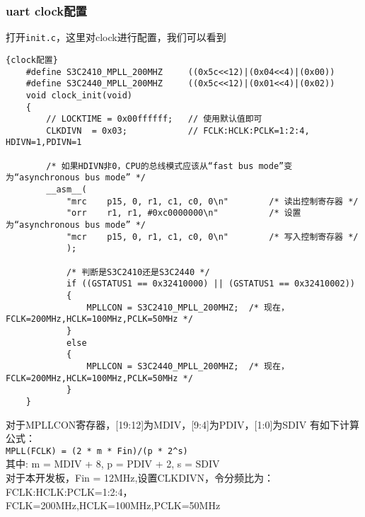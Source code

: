 \subsubsection{uart clock配置}
打开\lstinline{init.c}，这里对clock进行配置，我们可以看到
\lstset{language=C}
\begin{lstlisting}{clock配置}
    #define S3C2410_MPLL_200MHZ     ((0x5c<<12)|(0x04<<4)|(0x00))
    #define S3C2440_MPLL_200MHZ     ((0x5c<<12)|(0x01<<4)|(0x02))
    void clock_init(void)
    {
        // LOCKTIME = 0x00ffffff;   // 使用默认值即可
        CLKDIVN  = 0x03;            // FCLK:HCLK:PCLK=1:2:4, HDIVN=1,PDIVN=1

        /* 如果HDIVN非0，CPU的总线模式应该从“fast bus mode”变为“asynchronous bus mode” */
        __asm__(
            "mrc    p15, 0, r1, c1, c0, 0\n"        /* 读出控制寄存器 */ 
            "orr    r1, r1, #0xc0000000\n"          /* 设置为“asynchronous bus mode” */
            "mcr    p15, 0, r1, c1, c0, 0\n"        /* 写入控制寄存器 */
            );

            /* 判断是S3C2410还是S3C2440 */
            if ((GSTATUS1 == 0x32410000) || (GSTATUS1 == 0x32410002))
            {
                MPLLCON = S3C2410_MPLL_200MHZ;  /* 现在，FCLK=200MHz,HCLK=100MHz,PCLK=50MHz */
            }
            else
            {
                MPLLCON = S3C2440_MPLL_200MHZ;  /* 现在，FCLK=200MHz,HCLK=100MHz,PCLK=50MHz */
            }       
    }
\end{lstlisting}
对于MPLLCON寄存器，[19:12]为MDIV，[9:4]为PDIV，[1:0]为SDIV
有如下计算公式：\\
\lstinline{MPLL(FCLK) = (2 * m * Fin)/(p * 2^s)}\\
其中: m = MDIV + 8, p = PDIV + 2, s = SDIV\\
对于本开发板，Fin = 12MHz,设置CLKDIVN，令分频比为：FCLK:HCLK:PCLK=1:2:4，\\
FCLK=200MHz,HCLK=100MHz,PCLK=50MHz

